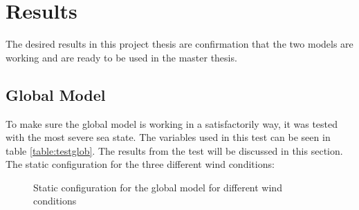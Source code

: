 \section{Results}
The desired results in this project thesis are confirmation that the two models are working and are ready to be used in the master thesis.
\subsection{Global Model}
To make sure the global model is working in a satisfactorily way, it was tested with the most severe sea state. The variables used in this test can be seen in table \ref{table:testglob}. The results from the test will be discussed in this section. \newline \newline
The static configuration for the three different wind conditions: 
\begin{figure}[H]
\hfill
{}\hfill
  \hfill
\caption[$\; \:$Static configuration for the global model]{Static configuration for the global model for different wind conditions}
\label{fig:statcon}
\end{figure}

